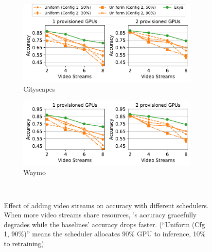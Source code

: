 \begin{figure}[t]
\captionsetup[subfigure]{justification=centering}
  \centering
  \begin{subfigure}[t]{0.75\linewidth}
    \centering
    \includegraphics[width=\linewidth]{ekya/results/sys_impl/sysimpl_varyingcities_streams_cityscapes.pdf}
    \caption{Cityscapes}
    \label{fig:sys-impl-cityscapes}
  \end{subfigure}
  \begin{subfigure}[t]{0.75\linewidth}
    \centering
    \includegraphics[width=\linewidth]{ekya/results/sys_impl/sysimpl_varyingcities_streams_waymo.pdf}
    \caption{Waymo}
    \label{fig:sys-impl-waymo}
  \end{subfigure}
  ~~~
  \caption{Effect of adding video streams on accuracy with different schedulers. When more video streams share resources, \name's accuracy gracefully degrades while the baselines' accuracy drops faster. (``Uniform (Cfg 1, 90\%)'' means the \fair scheduler allocates 90\% GPU to inference, 10\% to retraining)
  }
  \label{fig:scalability-sysimpl-fixedGPUs-accuracy}
\end{figure}

